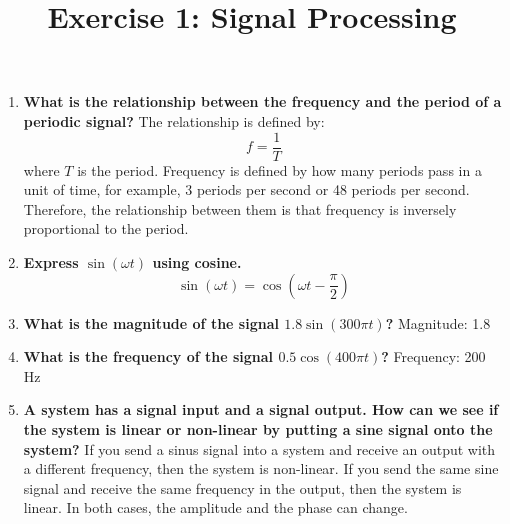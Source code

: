 \documentclass{article}
\begin{document}
\title{Exercise 1: Signal Processing}
\maketitle

\begin{enumerate}
    \item \textbf{What is the relationship between the frequency and the period of a periodic signal?}
    The relationship is defined by:
    \[ f = \frac{1}{T} \]
    where \( T \) is the period. Frequency is defined by how many periods pass in a unit of time, for example, 3 periods per second or 48 periods per second. Therefore, the relationship between them is that frequency is inversely proportional to the period.

    \item \textbf{Express \( \sin(\omega t) \) using cosine.}
    \[ \sin(\omega t) = \cos\left(\omega t - \frac{\pi}{2}\right) \]

    \item \textbf{What is the magnitude of the signal \( 1.8 \sin(300\pi t) \)?}
    Magnitude: 1.8

    \item \textbf{What is the frequency of the signal \( 0.5 \cos(400\pi t) \)?}
    Frequency: 200 Hz

    \item \textbf{A system has a signal input and a signal output. How can we see if the system is linear or non-linear by putting a sine signal onto the system?}
    If you send a sinus signal into a system and receive an output with a different frequency, then the system is non-linear. If you send the same sine signal and receive the same frequency in the output, then the system is linear. In both cases, the amplitude and the phase can change.
\end{enumerate}
\end{document}
